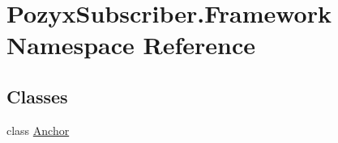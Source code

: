 \hypertarget{namespace_pozyx_subscriber_1_1_framework}{}\section{Pozyx\+Subscriber.\+Framework Namespace Reference}
\label{namespace_pozyx_subscriber_1_1_framework}
\subsection*{Classes}
\begin{DoxyCompactItemize}
\item 
class \hyperlink{class_pozyx_subscriber_1_1_framework_1_1_anchor}{Anchor}
\end{DoxyCompactItemize}
